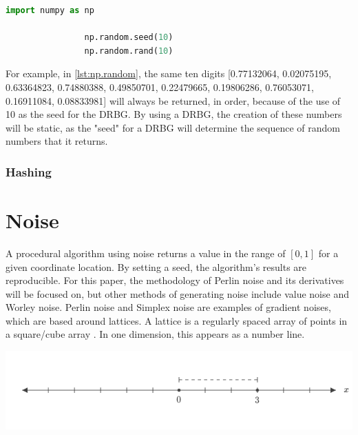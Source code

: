 \documentclass[10pt]{report}
\begin{document}
			\begin{lstlisting}[label={lst:np.random}, language=Python, frame=none, caption={An example of seeding NumPy's random function in Python}, captionpos=b]
				import numpy as np
				
				np.random.seed(10)
				np.random.rand(10)
			\end{lstlisting}
			
			For example, in \autoref{lst:np.random}, the same ten digits [0.77132064, 0.02075195, 0.63364823, 0.74880388, 0.49850701, 0.22479665, 0.19806286, 0.76053071, 0.16911084, 0.08833981] will always be returned, in order, because of the use of 10 as the seed for the DRBG. By using a DRBG, the creation of these numbers will be static, as the "seed" for a DRBG will determine the sequence of random numbers that it returns.
		
			\subsection{Hashing} \label{subsec:hashing}
			
			
		
	\vspace{10pt}
	\let\clearpage\relax
	\chapter{Noise}
		
		A procedural algorithm using noise returns a value in the range of \([0,1]\) for a given coordinate location. By setting a seed, the algorithm's results are reproducible. For this paper, the methodology of Perlin noise and its derivatives will be focused on, but other methods of generating noise include value noise and Worley noise. Perlin noise and Simplex noise are examples of gradient noises, which are based around lattices. A lattice is a regularly spaced array of points in a square/cube array \cite{integer-lattice}. In one dimension, this appears as a number line. 
		
		\begin{minipage}{\textwidth}
			\centering
			\includegraphics[scale=.4]{1d}
			\label{fig:1d}
		\end{minipage}
	
\end{document}
